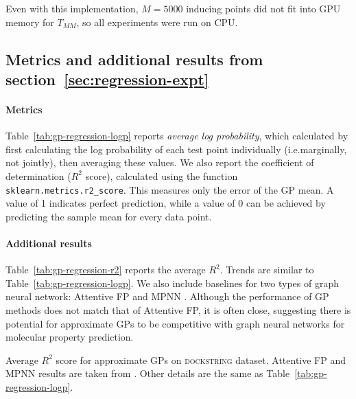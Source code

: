 Even with this implementation, $M=5000$ inducing points did not fit into GPU memory for $T_{MM}$,
so all experiments were run on CPU.

\subsection{Metrics and additional results from section~\ref{sec:regression-expt}}\label{apdx:regression-expt-extra-results}

\paragraph{Metrics}
Table~\ref{tab:gp-regression-logp} reports \emph{average log probability},
which calculated by first calculating the log probability of each test point individually
(i.e.\@ marginally, not jointly), then averaging these values.
We also report the coefficient of determination ($R^2$ score),
calculated using the function \texttt{sklearn.metrics.r2\_score}.
This measures only the error of the GP mean.
A value of 1 indicates perfect prediction,
while a value of 0 can be achieved by predicting the sample mean for every data point.

\paragraph{Additional results}
Table~\ref{tab:gp-regression-r2} reports the average $R^2$.
Trends are similar to Table~\ref{tab:gp-regression-logp}.
We also include baselines for two types of graph neural network:
Attentive FP \citep{xiong2019pushing}
and MPNN \citep{gilmer2017neural}.
Although the performance of GP methods does not match that of Attentive FP,
it is often close,
suggesting there is potential for approximate GPs to be competitive with graph neural networks
for molecular property prediction.

\begin{table}[tb]
\caption{
Average $R^2$ score for approximate GPs on \textsc{dockstring} dataset.
Attentive FP and MPNN results
are taken from \citet{garcia2022dockstring}.
Other details are the same as Table~\ref{tab:gp-regression-logp}.
}
\label{tab:gp-regression-r2}
\begin{center}
\resizebox{0.95\textwidth}{!}{
\begin{sc}

\end{sc}
}
\end{center}
\end{table}
